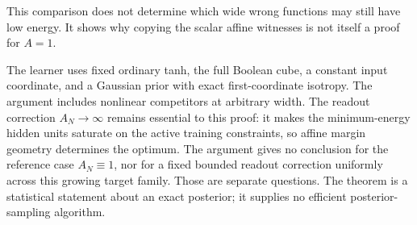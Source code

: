 \documentclass[11pt]{article}
\begin{document}
This comparison does not determine which wide wrong functions may still
have low energy. It shows why copying the scalar affine witnesses is not
itself a proof for $A=1$.

The learner uses fixed ordinary tanh, the full Boolean cube, a constant
input coordinate, and a Gaussian prior with exact first-coordinate
isotropy. The argument includes nonlinear competitors at arbitrary width.
The readout correction $A_N\to\infty$ remains essential to this proof:
it makes the minimum-energy hidden units saturate on the active training
constraints, so affine margin geometry determines the optimum. The argument gives no conclusion
for the reference case $A_N\equiv1$, nor for a fixed bounded readout
correction uniformly across this growing target family. Those are separate
questions. The theorem is a statistical statement about an exact posterior;
it supplies no efficient posterior-sampling algorithm.
\end{document}
